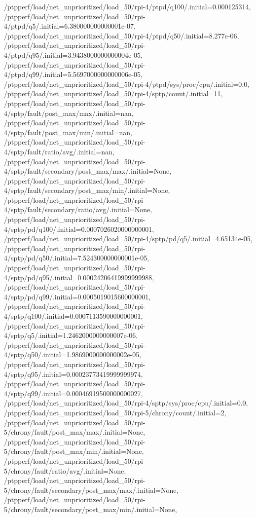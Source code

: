 {    /ptpperf/load/net_unprioritized/load_50/rpi-4/ptpd/q100/.initial=0.000125314,
    /ptpperf/load/net_unprioritized/load_50/rpi-4/ptpd/q5/.initial=6.380000000000001e-07,
    /ptpperf/load/net_unprioritized/load_50/rpi-4/ptpd/q50/.initial=8.277e-06,
    /ptpperf/load/net_unprioritized/load_50/rpi-4/ptpd/q95/.initial=3.9438000000000004e-05,
    /ptpperf/load/net_unprioritized/load_50/rpi-4/ptpd/q99/.initial=5.5697000000000006e-05,
    /ptpperf/load/net_unprioritized/load_50/rpi-4/ptpd/sys/proc/cpu/.initial=0.0,
    /ptpperf/load/net_unprioritized/load_50/rpi-4/sptp/count/.initial=11,
    /ptpperf/load/net_unprioritized/load_50/rpi-4/sptp/fault/post_max/max/.initial=nan,
    /ptpperf/load/net_unprioritized/load_50/rpi-4/sptp/fault/post_max/min/.initial=nan,
    /ptpperf/load/net_unprioritized/load_50/rpi-4/sptp/fault/ratio/avg/.initial=nan,
    /ptpperf/load/net_unprioritized/load_50/rpi-4/sptp/fault/secondary/post_max/max/.initial=None,
    /ptpperf/load/net_unprioritized/load_50/rpi-4/sptp/fault/secondary/post_max/min/.initial=None,
    /ptpperf/load/net_unprioritized/load_50/rpi-4/sptp/fault/secondary/ratio/avg/.initial=None,
    /ptpperf/load/net_unprioritized/load_50/rpi-4/sptp/pd/q100/.initial=0.0007026020000000001,
    /ptpperf/load/net_unprioritized/load_50/rpi-4/sptp/pd/q5/.initial=4.65134e-05,
    /ptpperf/load/net_unprioritized/load_50/rpi-4/sptp/pd/q50/.initial=7.524300000000001e-05,
    /ptpperf/load/net_unprioritized/load_50/rpi-4/sptp/pd/q95/.initial=0.00024206419999999988,
    /ptpperf/load/net_unprioritized/load_50/rpi-4/sptp/pd/q99/.initial=0.0005019015600000001,
    /ptpperf/load/net_unprioritized/load_50/rpi-4/sptp/q100/.initial=0.0007113590000000001,
    /ptpperf/load/net_unprioritized/load_50/rpi-4/sptp/q5/.initial=1.2462000000000007e-06,
    /ptpperf/load/net_unprioritized/load_50/rpi-4/sptp/q50/.initial=1.9869000000000002e-05,
    /ptpperf/load/net_unprioritized/load_50/rpi-4/sptp/q95/.initial=0.00023773419999999974,
    /ptpperf/load/net_unprioritized/load_50/rpi-4/sptp/q99/.initial=0.00046919500000000027,
    /ptpperf/load/net_unprioritized/load_50/rpi-4/sptp/sys/proc/cpu/.initial=0.0,
    /ptpperf/load/net_unprioritized/load_50/rpi-5/chrony/count/.initial=2,
    /ptpperf/load/net_unprioritized/load_50/rpi-5/chrony/fault/post_max/max/.initial=None,
    /ptpperf/load/net_unprioritized/load_50/rpi-5/chrony/fault/post_max/min/.initial=None,
    /ptpperf/load/net_unprioritized/load_50/rpi-5/chrony/fault/ratio/avg/.initial=None,
    /ptpperf/load/net_unprioritized/load_50/rpi-5/chrony/fault/secondary/post_max/max/.initial=None,
    /ptpperf/load/net_unprioritized/load_50/rpi-5/chrony/fault/secondary/post_max/min/.initial=None,
}
